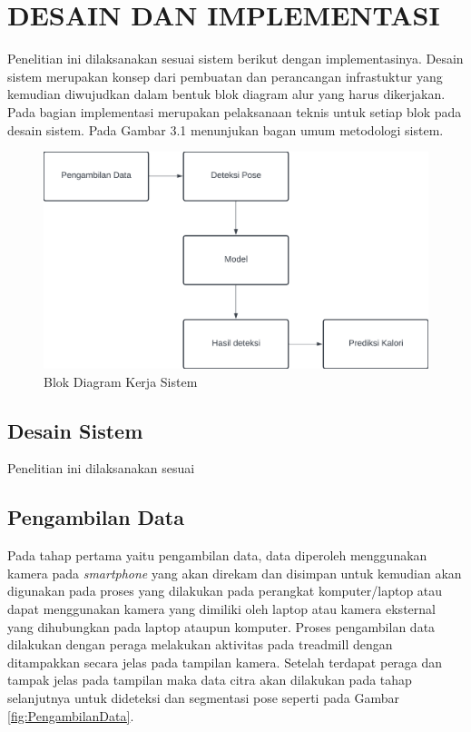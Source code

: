 \chapter{DESAIN DAN IMPLEMENTASI}
\label{chap:desainimplementasi}

Penelitian ini dilaksanakan sesuai sistem berikut dengan implementasinya. Desain sistem merupakan konsep dari pembuatan dan perancangan infrastuktur yang kemudian diwujudkan dalam bentuk blok diagram alur yang harus dikerjakan. Pada bagian implementasi merupakan pelaksanaan teknis untuk setiap blok pada desain sistem. Pada Gambar 3.1 menunjukan bagan umum metodologi sistem.

\begin{figure}[H]
  \centering
  \includegraphics[scale=0.215]{gambar/blok diagram metodologi3.png}
  \caption{Blok Diagram Kerja Sistem}
  \label{fig:BlokDiagram}
\end{figure}

\section{Desain Sistem}
\label{sec:DesainSistem}

Penelitian ini dilaksanakan sesuai \lipsum[1][1-5]

\section{Pengambilan Data}
\label{sec:PengambilanData}

Pada tahap pertama yaitu pengambilan data, data diperoleh menggunakan kamera pada \emph{smartphone} yang akan direkam dan disimpan untuk kemudian akan digunakan pada proses yang dilakukan pada perangkat komputer/laptop atau dapat menggunakan kamera yang dimiliki oleh laptop atau kamera eksternal yang dihubungkan pada laptop ataupun komputer. Proses pengambilan data dilakukan dengan peraga melakukan aktivitas pada treadmill dengan ditampakkan secara jelas pada tampilan kamera. Setelah terdapat peraga dan tampak jelas pada tampilan maka data citra akan dilakukan pada tahap selanjutnya untuk dideteksi dan segmentasi pose seperti pada Gambar \ref{fig:PengambilanData}.

